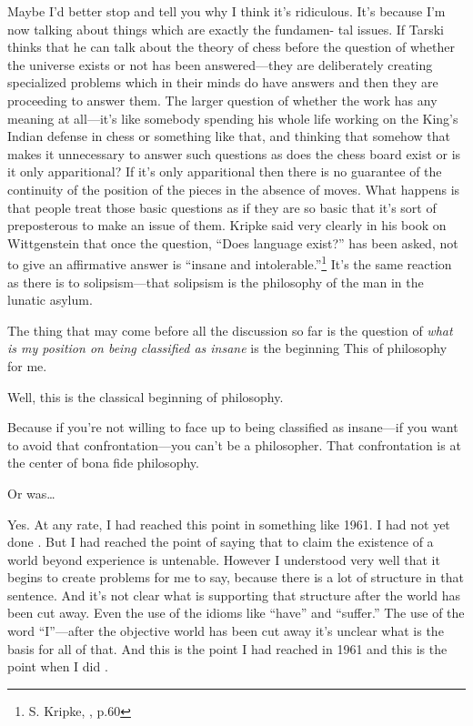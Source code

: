 Maybe I'd better stop and tell you why I think it's ridiculous. It's 
because I'm now talking about things which are exactly the fundamen- 
tal issues. If Tarski thinks that he can talk about the theory of chess 
before the question of whether the universe exists or not has been 
answered---they are deliberately creating specialized problems which in 
their minds do have answers and then they are proceeding to answer 
them. The larger question of whether the work has any meaning at 
all---it's like somebody spending his whole life working on the King's 
Indian defense in chess or something like that, and thinking that 
somehow that makes it unnecessary to answer such questions as does 
the chess board exist or is it only apparitional? If it's only apparitional 
then there is no guarantee of the continuity of the position of the pieces 
in the absence of moves. What happens is that people treat those basic 
questions as if they are so basic that it's sort of preposterous to make an 
issue of them. Kripke said very clearly in his book on Wittgenstein that 
once the question, \enquote{Does language exist?} has been asked, not to give 
an affirmative answer is \enquote{insane and intolerable.}\footnote{S. Kripke, 
, p.60} 
It's the same reaction as there is to solipsism---that solipsism is the philosophy of the 
man in the lunatic asylum. 

The thing that may come before all the discussion so far is the 
question of \emph{what is my position on being classified as insane} is the 
beginning This of philosophy for me. 

 Well, this is the classical beginning of philosophy. 

 Because if you're not willing to face up to being classified as 
insane---if you want to avoid that confrontation---you can't be a 
philosopher. That confrontation is at the center of bona fide philosophy. 

 Or was\ldots

 Yes. At any rate, I had reached this point in something like 
1961. I had not yet done . But I had reached 
the point of saying that to claim the existence of a world beyond 
experience is untenable. However I understood very well that it begins 
to create problems for me to say, 
because there is a lot of structure in that sentence. And it's not clear 
what is supporting that structure after the world has been cut away. 
Even the use of the idioms like \enquote{have} and \enquote{suffer.} The use of the word 
\enquote{I}---after the objective world has been cut away it's unclear what is the 
basis for all of that. And this is the point I had reached in 1961 and this is 
the point when I did .


